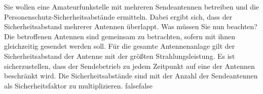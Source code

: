     {Sie wollen eine Amateurfunkstelle mit mehreren Sendeantennen betreiben und die Personenschutz-Sicherheitsabstände ermitteln. Dabei ergibt sich, dass der Sicherheitsabstand mehrerer Antennen überlappt. Was müssen Sie nun beachten?}
    {Die betroffenen Antennen sind gemeinsam zu betrachten, sofern mit ihnen gleichzeitig gesendet werden soll.}
    {Für die gesamte Antennenanlage gilt der Sicherheitsabstand der Antenne mit der größten Strahlungsleistung.}
    {Es ist sicherzustellen, dass der Sendebetrieb zu jedem Zeitpunkt auf eine der Antennen beschränkt wird.}
    {Die Sicherheitsabstände sind mit der Anzahl der Sendeantennen als Sicherheitsfaktor zu multiplizieren.}
    {false}{false}